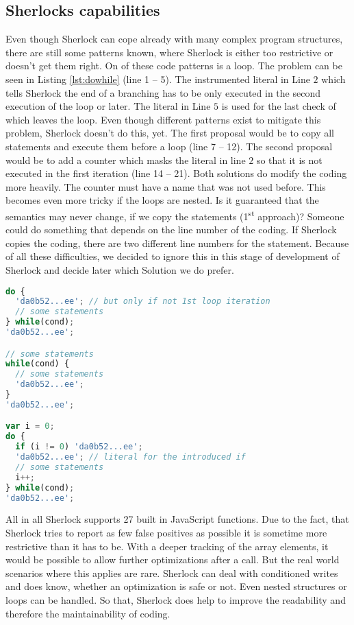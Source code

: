 \subsection{Sherlocks capabilities}
Even though Sherlock can cope already with many complex program structures, there are still
 some patterns known, where Sherlock is either too restrictive or doesn't get them right. 
On of these code patterns is a  loop. The problem can be seen in Listing
 \ref{lst:dowhile} (line 1 -- 5). The instrumented literal in Line $2$ which tells 
 Sherlock the end of a branching has to be only executed in the second execution of the
 loop or later. The literal in Line $5$ is used for the last check of  which 
 leaves the loop. Even though different patterns exist to mitigate this problem, Sherlock
 doesn't do this, yet. The first proposal would be to copy all statements and execute 
 them before a  loop (line 7 -- 12). The second proposal would be to add a 
 counter which masks the literal in line $2$ so that it is not executed in the first 
 iteration (line 14 -- 21). Both solutions do modify the coding more heavily. The counter
 must have a name that was not used before. This becomes even more tricky if the loops are
 nested. Is it guaranteed that the semantics may never change, if we copy the statements
 (1\textsuperscript{st} approach)? Someone could do something that depends on the line 
 number of the coding. If Sherlock copies the coding, there are two different line 
 numbers for the statement. Because of all these difficulties, we decided to ignore 
 this in this stage of development of Sherlock and decide later which Solution we do prefer.

\begin{lstlisting}[label=lst:dowhile,caption=Example for do-while loop and how Sherlock can
 handle them in future iterations.,language=Javascript]
do {
  'da0b52...ee'; // but only if not 1st loop iteration
  // some statements
} while(cond);
'da0b52...ee';

// some statements
while(cond) {
  // some statements
  'da0b52...ee';
}
'da0b52...ee';

var i = 0;
do {
  if (i != 0) 'da0b52...ee';
  'da0b52...ee'; // literal for the introduced if 
  // some statements
  i++;
} while(cond);
'da0b52...ee';
\end{lstlisting}


All in all Sherlock supports 27 built in JavaScript functions. Due to the fact, that
 Sherlock tries to report as few false positives as possible it is sometime more 
 restrictive than it has to be. With a deeper tracking of the array elements, it 
 would be possible to allow further optimizations after a 
 call. But the real world scenarios where this applies are rare. Sherlock can deal 
 with conditioned writes and does know, whether an optimization is safe or not. Even
 nested structures or loops can be handled. So that, Sherlock does help to improve 
 the readability and therefore the maintainability of coding.










